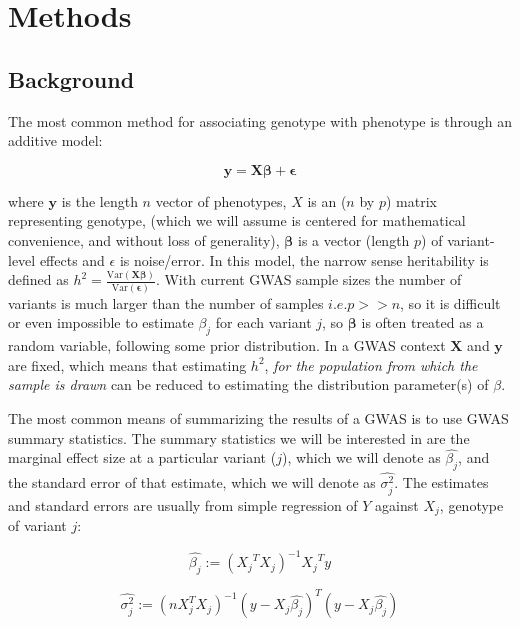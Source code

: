 \section{Methods}

\subsection{Background}

The most common method for associating genotype with phenotype is through  an additive model:

$$ \textbf{y}= \textbf{X} \boldsymbol{\beta} + \boldsymbol{\epsilon}$$

where $\textbf{y}$ is the length $n$ vector of phenotypes, \(X\) is an (\(n\) by \(p\)) matrix representing genotype, (which we will assume is centered for mathematical convenience, and without loss of generality), \(\boldsymbol{\beta}\) is a vector (length \(p\)) of variant-level effects and \(\epsilon\) is noise/error. In this model, the narrow sense heritability is defined as $h^2=\frac{\text{Var}(\textbf{X}\boldsymbol{\beta})}{\text{Var}(\boldsymbol{\epsilon})}$. With current GWAS sample sizes the number of variants is much larger than the number of samples \(i.e. p >>n\), so it is difficult or even impossible to estimate $\beta_j$ for each variant $j$, so $\boldsymbol{\beta}$ is often treated as a random variable, following some prior distribution. %
In a GWAS context $\textbf{X}$ and $\textbf{y}$ are fixed, which means that estimating $h^2$, \emph{for the population from which the sample is drawn} can be reduced to estimating the distribution parameter(s) of $\beta$. %

The most common means of summarizing the results of a GWAS is to use GWAS summary statistics.
The summary statistics we will be interested in are the marginal effect size at a particular variant (\(j\)), which we will denote as
\(\hat{\beta_j}\), and the standard error of that estimate, which we will denote as \(\hat{\sigma_j^2}\). The estimates and standard errors are usually from simple regression of $Y$ against $X_j$, genotype of variant $j$: 

$$ \hat{\beta_j} := {({X_j}^{T}X_j)}^{-1}{X_j}^{T}y $$

$$ \hat{\sigma_j^2} := (nX_j^TX_j)^{-1}(y-X_j\hat{\beta_j})^T(y-X_j\hat{\beta_j}) $$

